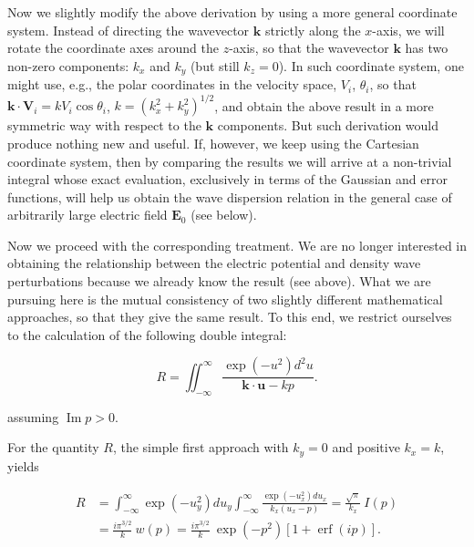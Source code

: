 \documentclass[draft]{agujournal2019}
\renewcommand{\vec}{\mathbf}
\begin{document}
{Now we slightly modify the above derivation by using a more general coordinate
system. Instead of directing the wavevector $\vec{k}$
strictly along the $x$-axis, we will rotate the coordinate axes around the
$z$-axis, so that the wavevector $\vec{k}$ has two non-zero components:
$k_{x}$ and $k_{y}$ (but still $k_{z}=0$). In such coordinate system, one
might use, e.g., the polar coordinates in the velocity space, $V_{i}$, $\theta_{i}$, so
that $\vec{k}\cdot\vec{V}_{i}=kV_{i}\cos\theta_{i}$, $k=(k_{x}^{2}+k_{y}%
^{2})^{1/2}$, and obtain the above result in a more symmetric way with respect
to the $\vec{k}$ components. But such derivation would produce nothing new and useful. If,
however, we keep using the Cartesian coordinate system, then by comparing
the results we will arrive at a non-trivial integral whose exact evaluation,
exclusively in terms of the Gaussian and error functions, will help us obtain
the wave dispersion relation in the general case of arbitrarily large
electric field $\vec{E}_{0}$ (see below).

Now we proceed with the corresponding treatment. We are no longer interested
in obtaining the relationship between the electric potential and density wave
perturbations because we already know the result (see above). What we are
pursuing here is the mutual consistency of two slightly different mathematical
approaches, so that they give the same result. To this end, we restrict
ourselves to the calculation of the following double integral:
\begin{linenomath*}
\begin{equation}
R=\iint_{-\infty}^{\infty}\frac{\exp\left(  -u^{2}\right)  d^{2}u}{\vec
{k}\cdot\vec{u}-kp}. 
\label{R}
\end{equation}
\end{linenomath*}
assuming $\operatorname{Im}p>0$.

For the quantity $R$, the simple first approach with $k_{y}=0$ and positive
$k_{x}=k$, yields
\begin{linenomath*}
\begin{align}
R  &  =\int_{-\infty}^{\infty}\exp\left(  -u_{y}^{2}\right)  du_{y}%
\int_{-\infty}^{\infty}\frac{\exp\left(  -u_{x}^{2}\right)  du_{x}}%
{k_{x}\left(  u_{x}-p\right)  }=\frac{\sqrt{\pi}}{k_{x}}\ I(p)\nonumber\\
&  =\frac{i\pi^{3/2}}{k}\ w\left(  p\right)  =\frac{i\pi^{3/2}}{k}%
\ \exp\left(  -p^{2}\right)  \left[  1+\operatorname{erf}\left(  ip\right)
\right]  . 
\label{R_classical}
\end{align}
\end{linenomath*}


}
\end{document}
